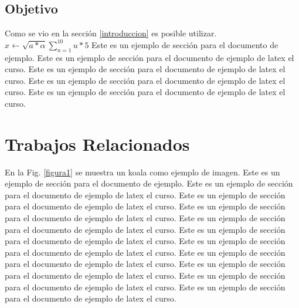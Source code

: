 \documentclass{article}
\begin{document}
\subsection{Objetivo}
Como se vio en la sección \ref{introduccion} es posible utilizar. $x \leftarrow \sqrt{a * \alpha} \sum_{n=1}^{10}{u*5}$
Este es un ejemplo de sección para el documento de ejemplo. Este es un ejemplo de sección para el documento de ejemplo de latex el curso. 
Este es un ejemplo de sección para el documento de ejemplo de latex el curso. 
Este es un ejemplo de sección para el documento de ejemplo de latex el curso. 
Este es un ejemplo de sección para el documento de ejemplo de latex el curso. 

\section{Trabajos Relacionados}
\label{trabajos}
En la Fig. \ref{figura1} se muestra un koala como ejemplo de imagen.  Este es un ejemplo de sección para el documento de ejemplo. Este es un ejemplo de sección para el documento de ejemplo de latex el curso. 
Este es un ejemplo de sección para el documento de ejemplo de latex el curso. 
Este es un ejemplo de sección para el documento de ejemplo de latex el curso. 
Este es un ejemplo de sección para el documento de ejemplo de latex el curso. Este es un ejemplo de sección para el documento de ejemplo de latex el curso. 
Este es un ejemplo de sección para el documento de ejemplo de latex el curso. 
Este es un ejemplo de sección para el documento de ejemplo de latex el curso. Este es un ejemplo de sección para el documento de ejemplo de latex el curso. 
Este es un ejemplo de sección para el documento de ejemplo de latex el curso. 
Este es un ejemplo de sección para el documento de ejemplo de latex el curso. 
\end{document}
